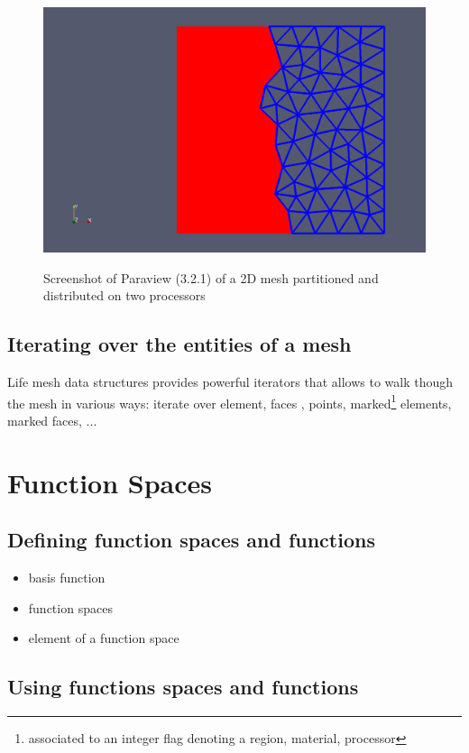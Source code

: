 \documentclass[a4paper]{book}
\newcommand{\life}{Life\xspace}
\begin{document}
\begin{figure}[htbp]
  \centering
  \includegraphics[width=.7\linewidth]{mymeshpartition}
  \label{fig:1}
  \caption{Screenshot of Paraview (3.2.1) of a 2D mesh partitioned and distributed on two processors}
\end{figure}


\subsection{Iterating over the entities of a mesh}

\life mesh data structures provides powerful iterators that allows to
walk though the mesh in various ways: iterate over element, faces ,
points, marked\footnote{associated to an integer flag denoting a
  region, material, processor} elements, marked faces, ...



\section{Function Spaces}
\label{sec:function-spaces}

\subsection{Defining function spaces and functions}

\begin{itemize}
\item basis function
\item function spaces
\item element of a function space
\end{itemize}

\subsection{Using functions spaces and functions}
\end{document}
